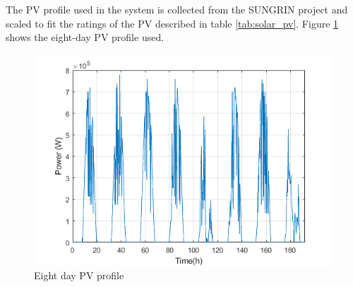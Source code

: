 The PV profile used in the system is collected from the SUNGRIN project and scaled to fit the ratings of the PV described in table \ref{tab:solar_pv}. Figure \ref{fig:PV_PROFILE_8} shows the eight-day PV profile used.

\begin{figure}[!ht]
    \centering
    \includegraphics[width = \linewidth]{figs/PV_PROFILE.png}
    \caption{Eight day PV profile}
    \label{fig:PV_PROFILE_8}
\end{figure}